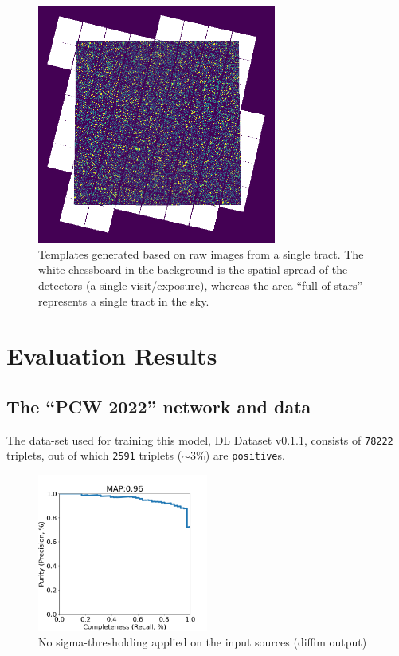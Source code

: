 \documentclass[DM,authoryear,toc]{lsstdoc}
\begin{document}
\begin{figure}[h]
  \centering
  \includegraphics[width=0.7\textwidth]{tract_templates.png}
  \caption{Templates generated based on raw images from a single tract. The white chessboard in the background is the spatial spread of the detectors (a single visit/exposure), whereas the area ``full of stars'' represents a single tract in the sky.}
  \label{fig:tract_templates}
\end{figure}

\clearpage
\section{Evaluation Results}

\subsection{The ``PCW 2022'' network and data}
The data-set used for training this model, DL Dataset v0.1.1, consists of \texttt{78222} triplets, out of which \texttt{2591} triplets ($\sim 3\%$) are \texttt{positive}s.

\begin{figure}[h]
  \centering
  \includegraphics[width=0.5\textwidth]{precrec___checkpoint_epoch0000087_0200000____rbdata_data_npy_data_gt1M___posw_30.png}
  \caption{No sigma-thresholding applied on the input sources (diffim output)}
  \label{fig:tract_templates}
\end{figure}
\end{document}
